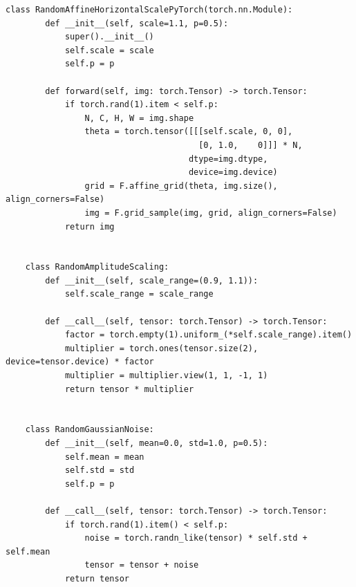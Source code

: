 \begin{lstlisting}[style=pythonstyle, caption={Custom data augmentation modules}, label=lst:custom_augmentations]
    class RandomAffineHorizontalScalePyTorch(torch.nn.Module):
        def __init__(self, scale=1.1, p=0.5):
            super().__init__()
            self.scale = scale
            self.p = p
            
        def forward(self, img: torch.Tensor) -> torch.Tensor:
            if torch.rand(1).item < self.p:
                N, C, H, W = img.shape
                theta = torch.tensor([[[self.scale, 0, 0],
                                       [0, 1.0,    0]]] * N,
                                     dtype=img.dtype,
                                     device=img.device)
                grid = F.affine_grid(theta, img.size(), align_corners=False)
                img = F.grid_sample(img, grid, align_corners=False)
            return img
    
    
    class RandomAmplitudeScaling:
        def __init__(self, scale_range=(0.9, 1.1)):
            self.scale_range = scale_range
        
        def __call__(self, tensor: torch.Tensor) -> torch.Tensor:
            factor = torch.empty(1).uniform_(*self.scale_range).item()
            multiplier = torch.ones(tensor.size(2), device=tensor.device) * factor
            multiplier = multiplier.view(1, 1, -1, 1)
            return tensor * multiplier
    
    
    class RandomGaussianNoise:
        def __init__(self, mean=0.0, std=1.0, p=0.5):
            self.mean = mean
            self.std = std
            self.p = p  
    
        def __call__(self, tensor: torch.Tensor) -> torch.Tensor:
            if torch.rand(1).item() < self.p:
                noise = torch.randn_like(tensor) * self.std + self.mean
                tensor = tensor + noise
            return tensor
    \end{lstlisting}


